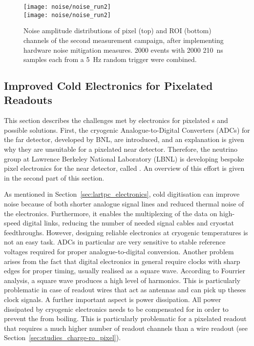 \begin{figure}[htb]
	\centering
	\texttt{[image: noise/noise\_run2]} \\
	\texttt{[image: noise/noise\_run2]}
	\caption{Noise amplitude distributions of pixel (top) and ROI (bottom) channels of the second measurement campaign, after implementing hardware noise mitigation measures.
	\num{2000} events with \num{2000} \SI{210}{\nano\second} samples each from a \SI{5}{\hertz} random trigger were combined.}
	\label{fig:electronics_noise-run2}
\end{figure}


\subsection{Improved Cold Electronics for Pixelated Readouts}
\label{sec:studies_electronics_pixel}

This section describes the challenges met by electronics for pixelated \lartpc{}s and possible solutions.
First, the cryogenic Analogue-to-Digital Converters (ADCs) for the \dune{} far detector, developed by BNL, are introduced, and an explanation is given why they are unsuitable for a pixelated near detector.
Therefore, the neutrino group at Lawrence Berkeley National Laboratory (LBNL) is developing bespoke pixel electronics for the near detector, called \larpix{}.
An overview of this effort is given in the second part of this section.

As mentioned in Section~\ref{sec:lartpc_electronics}, cold digitisation can improve noise because of both shorter analogue signal lines and reduced thermal noise of the electronics.
Furthermore, it enables the multiplexing of the data on high-speed digital links, reducing the number of needed signal cables and cryostat feedthroughs.
However, designing reliable electronics at cryogenic temperatures is not an easy task.
ADCs in particular are very sensitive to stable reference voltages required for proper analogue-to-digital conversion.
Another problem arises from the fact that digital electronics in general require clocks with sharp edges for proper timing, usually realised as a square wave.
According to Fourrier analysis, a square wave produces a high level of harmonics.
This is particularly problematic in case of readout wires that act as antennas and can pick up theses clock signals.
A further important aspect is power dissipation.
All power dissipated by cryogenic electronics needs to be compensated for in order to prevent the \lar{} from boiling.
This is particularly problematic for a pixelated readout that requires a much higher number of readout channels than a wire readout (see Section~\ref{sec:studies_charge-ro_pixel}).

